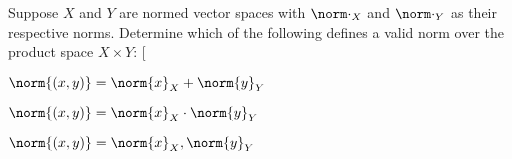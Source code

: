 \documentclass[10pt]{article}
\makeatletter
\def\@blist[#1]{%
    \bgroup\bgroup\par\vskip-\medskipamount%
    \gdef\item{%
        \par\egroup\bgroup\medskip\setbox0=\hbox{#1\quad}%
        \advance\leftskip by \wd0\leavevmode\kern-\wd0\box0%
    }%
}
\def\blist{\@ifnextchar[ \@blist {\@blist[$\bullet$]}}
\def\elist{\par\egroup\egroup\medskip}
\makeatother
\begin{document}


\bigskip

\begin{exercise*}

    Suppose $X$ and $Y$ are normed vector spaces with $\norm\cdot_X$ and $\norm\cdot_Y$ as their respective norms.
    Determine which of the following defines a valid norm over the product space $X\times Y$:
    \blist
        \item $\norm{(x, y)} = \norm{x}_X + \norm{y}_Y$
        \item $\norm{(x, y)} = \norm{x}_X\cdot\norm{y}_Y$
        \item $\norm{(x, y)} = \maxof{\norm{x}_X, \norm{y}_Y}$
    \elist

\end{exercise*}
\end{document}
